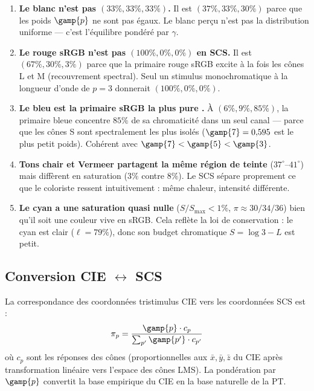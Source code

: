 \documentclass[12pt,a4paper]{article}
\begin{document}
\begin{enumerate}[nosep]
\item \textbf{Le blanc n'est pas $(33\%, 33\%, 33\%)$.} Il est
  $(37\%, 33\%, 30\%)$ parce que les poids $\gamp{p}$ ne sont pas
  \'egaux. Le blanc per\c{c}u n'est pas la distribution uniforme ---
  c'est l'\'equilibre pond\'er\'e par $\gamma$.

\item \textbf{Le rouge sRGB n'est pas $(100\%, 0\%, 0\%)$ en SCS.}
  Il est $(67\%, 30\%, 3\%)$ parce que la primaire rouge sRGB excite
  \`a la fois les c\^ones L et M (recouvrement spectral). Seul un
  stimulus monochromatique \`a la longueur d'onde de $p=3$ donnerait
  $(100\%, 0\%, 0\%)$.

\item \textbf{Le bleu est la primaire sRGB la plus \og pure \fg.}
  \`A $(6\%, 9\%, 85\%)$, la primaire bleue concentre $85\%$ de sa
  chromaticit\'e dans un seul canal --- parce que les c\^ones S sont
  spectralement les plus isol\'es ($\gamp{7} = 0{,}595$ est le plus
  petit poids). Coh\'erent avec
  $\gamp{7} < \gamp{5} < \gamp{3}$.

\item \textbf{Tons chair et Vermeer partagent la m\^eme r\'egion de
  teinte} ($37^\circ$--$41^\circ$) mais diff\`erent en saturation
  ($3\%$ contre $8\%$). Le SCS s\'epare proprement ce que le
  coloriste ressent intuitivement : m\^eme chaleur, intensit\'e
  diff\'erente.

\item \textbf{Le cyan a une saturation quasi nulle}
  ($S/S_{\max} < 1\%$, $\pi \approx 30/34/36$) bien qu'il soit une
  couleur vive en sRGB. Cela refl\`ete la loi de conservation : le
  cyan est clair ($\ell = 79\%$), donc son budget chromatique
  $S = \log 3 - L$ est petit.
\end{enumerate}

\subsection{Conversion CIE $\leftrightarrow$ SCS}

La correspondance des coordonn\'ees tristimulus CIE vers les
coordonn\'ees SCS est :
\begin{equation}
  \pi_p = \frac{\gamp{p} \cdot c_p}{\sum_{p'} \gamp{p'} \cdot c_{p'}}
\end{equation}
o\`u $c_p$ sont les r\'eponses des c\^ones (proportionnelles aux
$\bar{x}, \bar{y}, \bar{z}$ du CIE apr\`es transformation lin\'eaire
vers l'espace des c\^ones LMS). La pond\'eration par $\gamp{p}$
convertit la base empirique du CIE en la base naturelle de la PT.
\end{document}
